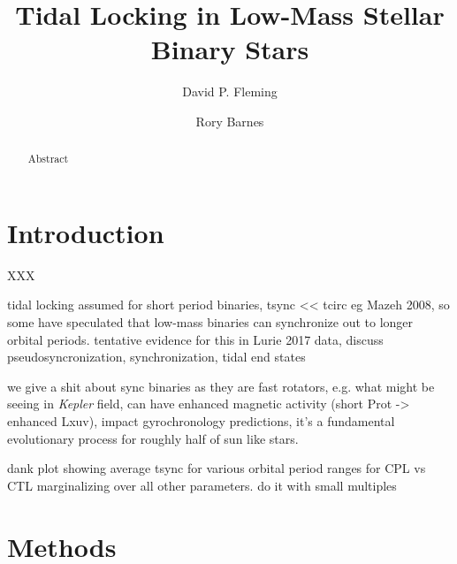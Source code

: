 \documentclass[twocolumn]{aastex61}
\newcommand{\kepler}[0]{\textit{Kepler}\xspace}
\begin{document}
\title{Tidal Locking in Low-Mass Stellar Binary Stars}



\author{David P. Fleming}

\author{Rory Barnes}


\begin{abstract}

Abstract

\end{abstract}




\section{Introduction} \label{sec:intro}

XXX

tidal locking assumed for short period binaries, tsync << tcirc eg Mazeh 2008, so some have speculated that low-mass binaries can synchronize out to longer orbital periods.  tentative evidence for this in Lurie 2017 data, discuss pseudosyncronization, synchronization, \citet{Counselman1973} tidal end states

we give a shit about sync binaries as they are fast rotators, e.g. what \citet{Simonian2018} might be seeing in \kepler field, can have enhanced magnetic activity (short Prot -> enhanced Lxuv), impact gyrochronology predictions, it's a fundamental evolutionary process for roughly half of sun like stars.

dank plot showing average tsync for various orbital period ranges for CPL vs CTL marginalizing over all other parameters. do it with small multiples


\section{Methods} \label{sec:methods}
\end{document}
